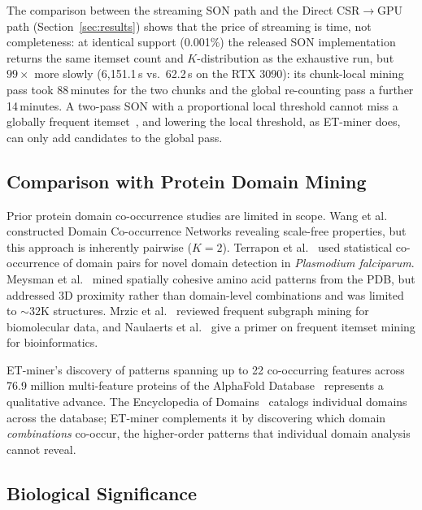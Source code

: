 \documentclass[10pt,a4paper,twocolumn]{article}
\begin{document}
The comparison between the streaming SON path and the Direct CSR$\to$GPU path (Section~\ref{sec:results}) shows that the price of streaming is time, not completeness: at identical support (0.001\%) the released SON implementation returns the same itemset count and $K$-distribution as the exhaustive run, but $99\times$ more slowly (6,151.1\,s vs.\ 62.2\,s on the RTX 3090): its chunk-local mining pass took 88\,minutes for the two chunks and the global re-counting pass a further 14\,minutes. A two-pass SON with a proportional local threshold cannot miss a globally frequent itemset~\cite{savasere1995}, and lowering the local threshold, as ET-miner does, can only add candidates to the global pass.

\subsection{Comparison with Protein Domain Mining}

Prior protein domain co-occurrence studies are limited in scope. Wang et al.~\cite{wang2011} constructed Domain Co-occurrence Networks revealing scale-free properties, but this approach is inherently pairwise ($K{=}2$). Terrapon et al.~\cite{coin2009} used statistical co-occurrence of domain pairs for novel domain detection in \emph{Plasmodium falciparum}. Meysman et al.~\cite{meysman2015} mined spatially cohesive amino acid patterns from the PDB, but addressed 3D proximity rather than domain-level combinations and was limited to ${\sim}32$K structures. Mrzic et al.~\cite{mrzic2018} reviewed frequent subgraph mining for biomolecular data, and Naulaerts et al.~\cite{naulaerts2015} give a primer on frequent itemset mining for bioinformatics.

ET-miner's discovery of patterns spanning up to 22 co-occurring features across 76.9 million multi-feature proteins of the AlphaFold Database~\cite{varadi2024} represents a qualitative advance. The Encyclopedia of Domains~\cite{barrio2024} catalogs individual domains across the database; ET-miner complements it by discovering which domain \emph{combinations} co-occur, the higher-order patterns that individual domain analysis cannot reveal.

\subsection{Biological Significance}
\end{document}
